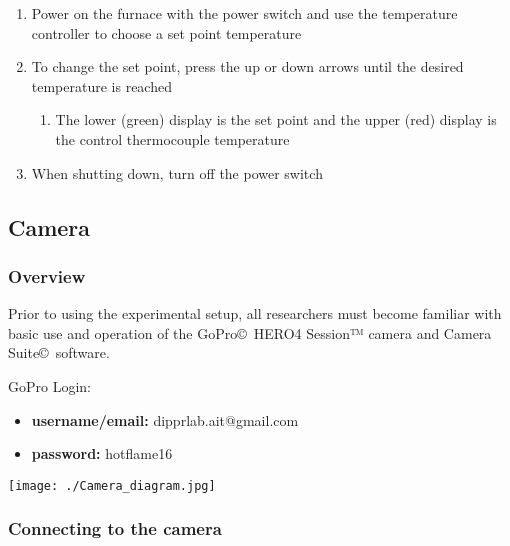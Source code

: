\begin{enumerate}
\def\labelenumi{\arabic{enumi}.}
\item
  Power on the furnace with the power switch and use the temperature
  controller to choose a set point temperature
\item
  To change the set point, press the up or down arrows until the desired
  temperature is reached

  \begin{enumerate}
  \def\labelenumii{\arabic{enumii}.}
  \tightlist
  \item
    The lower (green) display is the set point and the upper (red)
    display is the control thermocouple temperature
  \end{enumerate}
\item
  When shutting down, turn off the power switch
\end{enumerate}

\hypertarget{camera}{%
\subsection{Camera}\label{camera}}

\hypertarget{overview-1}{%
\subsubsection{Overview}\label{overview-1}}

Prior to using the experimental setup, all researchers must become
familiar with basic use and operation of the GoPro©~HERO4 Session™
camera and Camera Suite©~software.

GoPro Login:

\begin{itemize}
\tightlist
\item
  \textbf{username/email:} dipprlab.ait@gmail.com
\item
  \textbf{password:} hotflame16
\end{itemize}

\texttt{[image: ./Camera\_diagram.jpg]}

\hypertarget{connecting-to-the-camera}{%
\subsubsection{Connecting to the
camera}\label{connecting-to-the-camera}}

